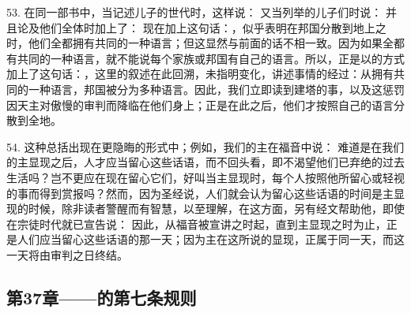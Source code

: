 53. 在同一部书中，当记述儿子的世代时，这样说： 又当列举的儿子们时说： 并且论及他们全体时加上了： 现在加上这句话：，似乎表明在邦国分散到地上之时，他们全都拥有共同的一种语言；但这显然与前面的话不相一致。因为如果全都有共同的一种语言，就不能说每个家族或邦国有自己的语言。所以，正是以的方式加上了这句话：，这里的叙述在此回溯，未指明变化，讲述事情的经过：从拥有共同的一种语言，邦国被分为多种语言。因此，我们立即读到建塔的事，以及这惩罚因天主对傲慢的审判而降临在他们身上；正是在此之后，他们才按照自己的语言分散到全地。\par

54. 这种总括出现在更隐晦的形式中；例如，我们的主在福音中说： 难道是在我们的主显现之后，人才应当留心这些话语，而不回头看，即不渴望他们已弃绝的过去生活吗？岂不更应在现在留心它们，好叫当主显现时，每个人按照他所留心或轻视的事而得到赏报吗？然而，因为圣经说，人们就会认为留心这些话语的时间是主显现的时候，除非读者警醒而有智慧，以至理解，在这方面，另有经文帮助他，即使在宗徒时代就已宣告说： 因此，从福音被宣讲之时起，直到主显现之时为止，正是人们应当留心这些话语的那一天；因为主在这所说的显现，正属于同一天，而这一天将由审判之日终结。\par


\subsection{第37章——的第七条规则}

